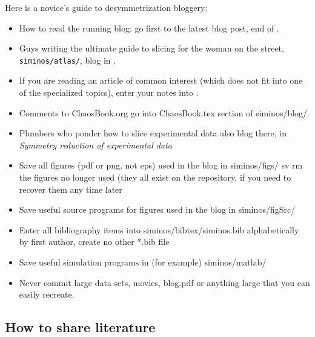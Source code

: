 Here is a novice's guide to desymmetrization bloggery:
\begin{itemize}
  \item
How to read the running blog: go first to the latest blog post, end
of .
  \item
Guys writing the ultimate guide to slicing for the woman on the street,
\texttt{siminos/atlas/}, blog in .
  \item
If you are reading an article of common interest (which does not fit into
one of the specialized topics), enter your notes into .
  \item
Comments to ChaosBook.org go into ChaosBook.tex section of siminos/blog/.
  \item
Plumbers who ponder how to slice experimental data also blog there,  in
 {\em Symmetry reduction of experimental data}
  \item
Save all figures (pdf or png, not eps) used in the blog in siminos/figs/
sv rm the figures no longer used (they all exist on the repository, if
you need to recover them any time later
  \item
Save useful source programs for figures used in the blog in siminos/figSrc/
  \item
Enter all bibliography items into siminos/bibtex/siminos.bib alphabetically by
first author, create no other *.bib file
  \item
Save useful simulation programs  in (for example) siminos/matlab/
  \item
Never commit large data sets, movies, blog.pdf or anything large that you
can easily recreate.


\end{itemize}

\subsection{How to share literature}
\label{s:HowToLit}

